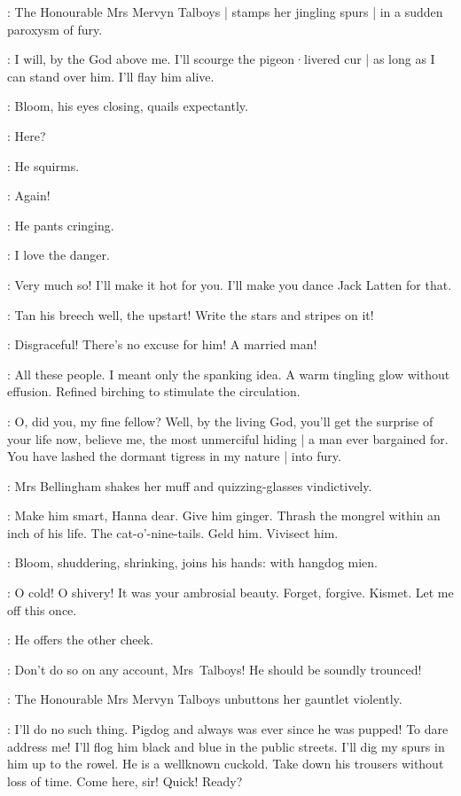 :
The Honourable Mrs Mervyn Talboys |
stamps her jingling spurs |
in a sudden paroxysm of fury.

\Talboys:
I will,
by the God above me.
I'll scourge the pigeon·livered cur |
as long as I can stand over him.
I'll flay him alive.

:
Bloom,
his eyes closing,
quails expectantly.

\Bloom:
Here?

:
He squirms.

\Bloom:
Again!

:
He pants cringing.

\Bloom:
I love the danger.

\Talboys:
Very much so!
I'll make it hot for you.
I'll make you dance Jack Latten for that.

\Bellingham:
Tan his breech well,
the upstart!
Write the stars and stripes on it!

\Yelverton:
Disgraceful!
There's no excuse for him!
A married man!

\Bloom:
All these people.
I meant only the spanking idea.
A warm tingling glow without effusion.
Refined birching to stimulate the circulation.

\Talboys:
O,
did you,
my fine fellow?
Well,
by the living God,
you'll get the surprise of your life now,
believe me,
the most unmerciful hiding |
a man ever bargained for.
You have lashed the dormant tigress in my nature |
into fury.

:
Mrs Bellingham shakes her muff and quizzing-glasses vindictively.

\Bellingham:
Make him smart,
Hanna dear.
Give him ginger.
Thrash the mongrel within an inch of his life.
The cat-o'-nine-tails.
Geld him.
Vivisect him.

:
Bloom,
shuddering,
shrinking,
joins his hands:
with hangdog mien.

\Bloom:
O cold!
O shivery!
It was your ambrosial beauty.
Forget,
forgive.
Kismet.
Let me off this once.

:
He offers the other cheek.

\Yelverton:
Don't do so on any account,
Mrs~Talboys!
He should be soundly trounced!

:
The Honourable Mrs Mervyn Talboys unbuttons her gauntlet violently.

\Talboys:
I'll do no such thing.
Pigdog and always was ever since he was pupped!
To dare address me!
I'll flog him black and blue in the public streets.
I'll dig my spurs in him up to the rowel.
He is a wellknown cuckold.
Take down his trousers without loss of time.
Come here,
sir!
Quick!
Ready?

